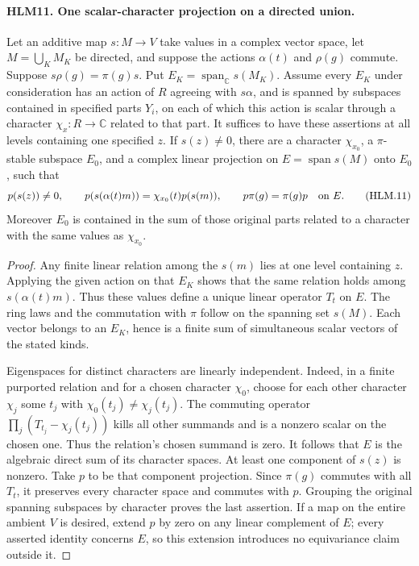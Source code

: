 \documentclass[11pt,a4paper]{article}
\numberwithin{equation}{section}
\theoremstyle{remark}\newtheorem{remark}[theorem]{Remark}
\begin{document}
\paragraph{HLM11. One scalar-character projection on a directed union.}
\label{claim:HLM11}
Let an additive map \(s:M\to V\) take values in a complex vector
space, let \(M=\bigcup_KM_K\) be directed, and suppose the
actions \(\alpha(t)\) and \(\rho(g)\) commute.  Suppose
\(s\rho(g)=\pi(g)s\).  Put
\(E_K=\operatorname{span}_{\mathbb C}s(M_K)\).
Assume every \(E_K\) under consideration has an action of
\(R\) agreeing with \(s\alpha\), and is spanned by
subspaces contained in specified parts \(Y_i\), on each of
which this action is scalar through a character
\(\chi_x:R\to\mathbb C\) related to that part.
It suffices to have these assertions at all levels containing
one specified \(z\).  If \(s(z)\ne0\), there are a character
\(\chi_{x_0}\), a \(\pi\)-stable subspace \(E_0\), and
a complex linear projection on \(E=\operatorname{span}s(M)\)
onto \(E_0\), such that
\[
 p(s(z))\ne0,\qquad p(s(\alpha(t)m))=\chi_{x_0}(t)p(s(m)),
 \qquad p\pi(g)=\pi(g)p\quad\hbox{on }E.
 \tag{HLM.11}
\]
Moreover \(E_0\) is contained in the sum of those original
parts related to a character with the same values as
\(\chi_{x_0}\).
\begin{proof}
Any finite linear relation among the \(s(m)\) lies at one
level containing \(z\).  Applying the given action on that
\(E_K\) shows that the same relation holds among
\(s(\alpha(t)m)\).  Thus these values define a unique
linear operator \(T_t\) on \(E\).  The ring laws and the
commutation with \(\pi\) follow on the spanning set \(s(M)\).
Each vector belongs to an \(E_K\), hence is a finite sum
of simultaneous scalar vectors of the stated kinds.

Eigenspaces for distinct characters are linearly independent.
Indeed, in a finite purported relation and for a chosen
character \(\chi_0\), choose for each other character
\(\chi_j\) some \(t_j\) with
\(\chi_0(t_j)\ne\chi_j(t_j)\).  The commuting operator
\(\prod_j(T_{t_j}-\chi_j(t_j))\) kills all other summands
and is a nonzero scalar on the chosen one.  Thus the relation's
chosen summand is zero.  It follows that \(E\) is the
algebraic direct sum of its character spaces.  At least one
component of \(s(z)\) is nonzero.  Take \(p\) to be that
component projection.  Since \(\pi(g)\) commutes with all
\(T_t\), it preserves every character space and commutes
with \(p\).  Grouping the original spanning subspaces by
character proves the last assertion.  If a map on the entire
ambient \(V\) is desired, extend \(p\) by zero on any
linear complement of \(E\); every asserted identity concerns
\(E\), so this extension introduces no equivariance claim
outside it.
\end{proof}
\end{document}
